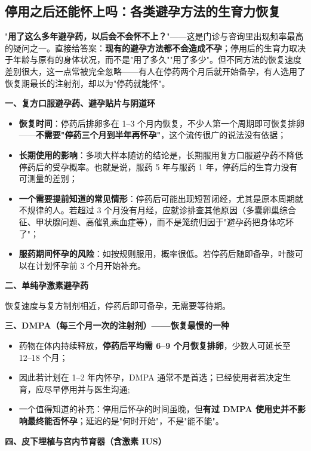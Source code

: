 \subsection{停用之后还能怀上吗：各类避孕方法的生育力恢复}

"\textbf{用了这么多年避孕药，以后会不会怀不上？}"——这是门诊与咨询里出现频率最高的疑问之一。直接给答案：\textbf{现有的避孕方法都不会造成不孕}；停用后的生育力取决于年龄与原有的身体状况，而不是"用了多久""用了多少"。但不同方法的恢复速度差别很大，这一点常被完全忽略——有人在停药两个月后就开始备孕，有人选用了恢复期最长的注射剂，却以为"停药就能怀"。

\textbf{一、复方口服避孕药、避孕贴片与阴道环}

\begin{itemize}
\item \textbf{恢复时间}：停药后排卵多在 1--3 个月内恢复，不少人第一个周期即可恢复排卵——\textbf{不需要"停药三个月到半年再怀孕"}，这个流传很广的说法没有依据；
\item \textbf{长期使用的影响}：多项大样本随访的结论是，长期服用复方口服避孕药不降低停药后的受孕概率。也就是说，服药 5 年与服药 1 年，停药后的生育力没有可测量的差别；
\item \textbf{一个需要提前知道的常见情形}：停药后可能出现短暂闭经，尤其是原本周期就不规律的人。若超过 3 个月没有月经，应就诊排查其他原因（多囊卵巢综合征、甲状腺问题、高催乳素血症等），而不是笼统归因于"避孕药把身体吃坏了"；
\item \textbf{服药期间怀孕的风险}：如按规则服用，概率很低。若停药后随即备孕，叶酸可以在计划怀孕前 3 个月开始补充。
\end{itemize}

\textbf{二、单纯孕激素避孕药}

恢复速度与复方制剂相近，停药后即可备孕，无需要等待期。

\textbf{三、DMPA（每三个月一次的注射剂）——恢复最慢的一种}

\begin{itemize}
\item 药物在体内持续释放，\textbf{停药后平均需 6--9 个月恢复排卵}，少数人可延长至 12--18 个月；
\item 因此若计划在 1--2 年内怀孕，DMPA 通常不是首选；已经使用者若决定生育，应尽早停用并与医生沟通;
\item 一个值得知道的补充：停用后怀孕的时间虽晚，但\textbf{有过 DMPA 使用史并不影响最终能否怀孕}；延迟的是"何时开始"，不是"能不能"。
\end{itemize}

\textbf{四、皮下埋植与宫内节育器（含激素 IUS）}

